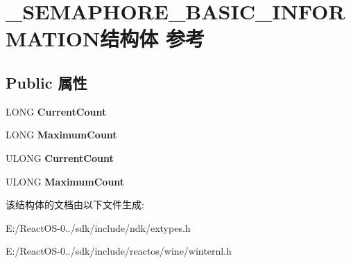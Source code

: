 \hypertarget{struct___s_e_m_a_p_h_o_r_e___b_a_s_i_c___i_n_f_o_r_m_a_t_i_o_n}{}\section{\+\_\+\+S\+E\+M\+A\+P\+H\+O\+R\+E\+\_\+\+B\+A\+S\+I\+C\+\_\+\+I\+N\+F\+O\+R\+M\+A\+T\+I\+O\+N结构体 参考}
\label{struct___s_e_m_a_p_h_o_r_e___b_a_s_i_c___i_n_f_o_r_m_a_t_i_o_n}
\subsection*{Public 属性}
\begin{DoxyCompactItemize}
\item 
\mbox{\label{struct___s_e_m_a_p_h_o_r_e___b_a_s_i_c___i_n_f_o_r_m_a_t_i_o_n_a1328251e24ef0ebbbbceead2b337bf66}} 
L\+O\+NG {\bfseries Current\+Count}
\item 
\mbox{\label{struct___s_e_m_a_p_h_o_r_e___b_a_s_i_c___i_n_f_o_r_m_a_t_i_o_n_ac52f423552d1120b99340db9f1bdfeed}} 
L\+O\+NG {\bfseries Maximum\+Count}
\item 
\mbox{\label{struct___s_e_m_a_p_h_o_r_e___b_a_s_i_c___i_n_f_o_r_m_a_t_i_o_n_a94e9231c8be5734f5778b7734057468c}} 
U\+L\+O\+NG {\bfseries Current\+Count}
\item 
\mbox{\label{struct___s_e_m_a_p_h_o_r_e___b_a_s_i_c___i_n_f_o_r_m_a_t_i_o_n_ac453cbf8bea47778805085097f4c90d2}} 
U\+L\+O\+NG {\bfseries Maximum\+Count}
\end{DoxyCompactItemize}


该结构体的文档由以下文件生成\+:\begin{DoxyCompactItemize}
\item 
E\+:/\+React\+O\+S-\/0../sdk/include/ndk/extypes.\+h\item 
E\+:/\+React\+O\+S-\/0../sdk/include/reactos/wine/winternl.\+h\end{DoxyCompactItemize}
